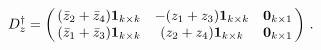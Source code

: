 \begin{equation}
D_z^{\dagger} =
\left( \begin{array}{@{\,}ccc@{\,}}
   (\bar{z}_2+\bar{z}_4) \mathbf{1}_{k\times k} & 
   -(z_1+z_3)\mathbf{1}_{k\times k} & 
   \mathbf{0}_{k\times 1} \\
   (\bar{z}_1+\bar{z}_3)\mathbf{1}_{k\times k}  & 
   (z_2+z_4) \mathbf{1}_{k\times k} &  
   \mathbf{0}_{k\times 1} 
  \end{array}  \right)\,.\label{eq:5.7}
\end{equation}

